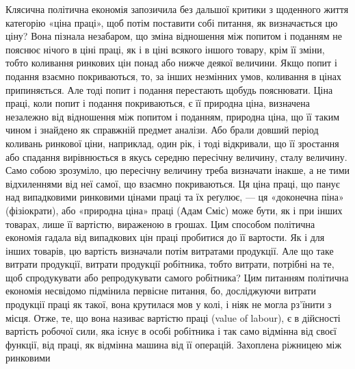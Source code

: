 Клясична політична економія запозичила без дальшої критики
з щоденного життя категорію «ціна праці», щоб потім поставити
собі питання, як визначається цю ціну? Вона пізнала
незабаром, що зміна відношення між попитом і поданням не
пояснює нічого в ціні праці, як і в ціні всякого іншого товару,
крім її зміни, тобто коливання ринкових цін понад або нижче
деякої величини. Якщо попит і подання взаємно покриваються,
то, за інших незмінних умов, коливання в цінах припиняється.
Але тоді попит і подання перестають щобудь пояснювати. Ціна
праці, коли попит і подання покриваються, є її природна ціна,
визначена незалежно від відношення між попитом і поданням,
природна ціна, що її таким чином і знайдено як справжній предмет
аналізи. Або брали довший період коливань ринкової ціни,
наприклад, один рік, і тоді відкривали, що її зростання або
спадання вирівнюється в якусь середню пересічну величину,
сталу величину. Само собою зрозуміло, цю пересічну величину
треба визначати інакше, а не тими відхиленнями від неї самої,
що взаємно покриваються. Ця ціна праці, що панує над випадковими
ринковими цінами праці та їх реґулює, — ця «доконечна
піна» (фізіократи), або «природна ціна» праці (Адам Сміс) може
бути, як і при інших товарах, лише її вартістю, вираженою в
грошах. Цим способом політична економія гадала від випадкових
цін праці пробитися до її вартости. Як і для інших товарів,
цю вартість визначали потім витратами продукції. Але що таке
витрати продукції, витрати продукції робітника, тобто витрати,
потрібні на те, щоб спродукувати або репродукувати самого
робітника? Цим питанням політична економія несвідомо підмінила
первісне питання, бо, досліджуючи витрати продукції
праці як такої, вона крутилася мов у колі, і ніяк не могла рз’їнити
з місця. Отже, те, що вона називає вартістю праці (value of labour),
є в дійсності вартість робочої сили, яка існує в особі
робітника і так само відмінна від своєї функції, від праці, як
відмінна машина від її операцій. Захоплена ріжницею між ринковими
\parbreak{}  %
